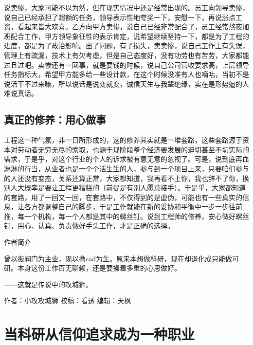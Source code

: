 \documentclass[]{book}
\begin{document}
说卖惨，大家可能不以为然，但在现实情况中还是经常出现的。员工向领导卖惨，说自己已经承担了超额的任务，领导表示性地夸奖一下，安慰一下，再说涨点工资，看起来皆大欢喜。乙方向甲方卖惨，说自己已经非常配合了，员工经常熬夜加班配合工作，甲方领导象征性的表示肯定，说希望继续坚持一下，都是为了工程的进度，都是为了政治影响。出了问题，有了损失，卖卖惨，说自己工作上有失误，管理上有疏漏，技术上有欠考虑，但是自己态度好，没有功劳也有苦劳，大家都能过且过吧。卖惨还有一回事，就是要钱的时候，说自己公司营收要求高，上层领导任务指标大，希望甲方能多给一些设计款，在这个时候没准有人也嘀咕，当初不是说活干不过来嘛，所以说话是说变就变，诚信天生与我辈绝缘，实在是形势逼的人难说真话。

\hypertarget{ux771fux6b63ux7684ux4feeux517bux7528ux5fc3ux505aux4e8b}{%
\subsection{真正的修养：用心做事}\label{ux771fux6b63ux7684ux4feeux517bux7528ux5fc3ux505aux4e8b}}

工程这一种气氛，非一日所形成的，这的修养其实就是一堆套路，这些套路源于资本对劳动者无穷无尽的索取，也源于现阶段整个经济要发展的迫切甚至不切实际的需求，于是乎，对这个行业的个人的诉求被有意无意的忽视了。可是，说到底再血淋淋的行当，从业者也是一个个活生生的人，参与到一个项目上来，只要咱们参与的人还没有变态，关系还算正常，大家都知道，我再看不上你，我也辞不了你，换别人大概率是要让工程更糟糕的（前提是有别人愿意接手）。于是乎，大家都知道的套路，用了一回又一回，在套路中，不仅得到的是虚伪，可能也有一些真实的信息，让各方都调整自己的脚步，于是工作就能在新的妥协和平衡中一步一步往前推，每一个机构，每一个人都是其中的螺丝钉。说到工程师的修养，安心做好螺丝钉，用心、认真、负责做好手头工作，才是正确的选择。

作者简介

曾以扳阀门为主业，现以撸cad为生。原来本想做科研，现在却退化成只能做可研。本身这份工作百无聊赖，还是要操着多重的心思做好。

------这就是传说中的攻城狮。

作者：小攻攻城狮
校稿：看透
编辑：天枫

\hypertarget{ux5f53ux79d1ux7814ux4eceux4fe1ux4ef0ux8ffdux6c42ux6210ux4e3aux4e00ux79cdux804cux4e1a}{%
\section{当科研从信仰追求成为一种职业}\label{ux5f53ux79d1ux7814ux4eceux4fe1ux4ef0ux8ffdux6c42ux6210ux4e3aux4e00ux79cdux804cux4e1a}}
\end{document}
